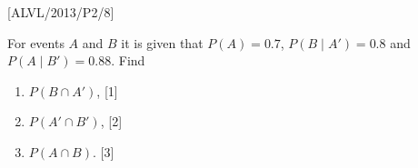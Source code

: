 \item {[}ALVL/2013/P2/8{]}

For events $A$ and $B$ it is given that $P\left(A\right)=0.7$,
$P\left(B\mid A'\right)=0.8$ and $P\left(A\mid B'\right)=0.88$.
Find 
\begin{enumerate}
\item $P\left(B\cap A'\right)$, \hfill{}{[}1{]}
\item $P\left(A'\cap B'\right)$, \hfill{}{[}2{]}
\item $P\left(A\cap B\right)$. \hfill{}{[}3{]}
\end{enumerate}
